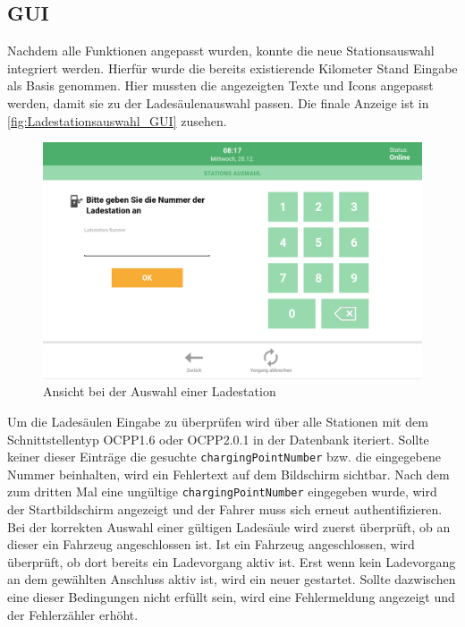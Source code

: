 \subsection{GUI}
Nachdem alle Funktionen angepasst wurden, konnte die neue Stationsauswahl integriert werden. Hierfür wurde die bereits existierende Kilometer Stand Eingabe als Basis genommen. Hier mussten die angezeigten Texte und Icons angepasst werden, damit sie zu der Ladesäulenauswahl passen. Die finale Anzeige ist in \autoref{fig:Ladestationsauswahl_GUI} zusehen. 
\begin{figure}[H]
	\centering
	\includegraphics[width=1.0\textwidth]{images/GUI/LadestationsAuswahl.png}
	\caption{Ansicht bei der Auswahl einer Ladestation \cite{Konzept}}
	\label{fig:Ladestationsauswahl_GUI}
\end{figure}
\noindent Um die Ladesäulen Eingabe zu überprüfen wird über alle Stationen mit dem Schnittstellentyp OCPP1.6 oder OCPP2.0.1 in der Datenbank iteriert. Sollte keiner dieser Einträge die gesuchte \verb|chargingPointNumber| bzw. die eingegebene Nummer beinhalten, wird ein Fehlertext auf dem Bildschirm sichtbar. Nach dem zum dritten Mal eine ungültige \verb|chargingPointNumber| eingegeben wurde, wird der Startbildschirm angezeigt und der Fahrer muss sich erneut authentifizieren. Bei der korrekten Auswahl einer gültigen Ladesäule wird zuerst überprüft, ob an dieser ein Fahrzeug angeschlossen ist. Ist ein Fahrzeug angeschlossen, wird überprüft, ob dort bereits ein Ladevorgang aktiv ist. Erst wenn kein Ladevorgang an dem gewählten Anschluss aktiv ist, wird ein neuer gestartet. Sollte dazwischen eine dieser Bedingungen nicht erfüllt sein, wird eine Fehlermeldung angezeigt und der Fehlerzähler erhöht.\newline

